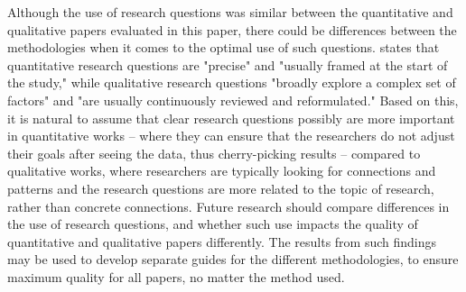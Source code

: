 Although the use of research questions was similar between the quantitative and qualitative papers evaluated in this paper, there could be differences between the methodologies when it comes to the optimal use of such questions. \textcite[p.3-4]{Barroga_2022} states that quantitative research questions are "precise" and "usually framed at the start of the study," while qualitative research questions "broadly explore a complex set of factors" and "are usually continuously reviewed and reformulated." Based on this, it is natural to assume that clear research questions possibly are more important in quantitative works -- where they can ensure that the researchers do not adjust their goals after seeing the data, thus cherry-picking results -- compared to qualitative works, where researchers are typically looking for connections and patterns and the research questions are more related to the topic of research, rather than concrete connections. Future research should compare differences in the use of research questions, and whether such use impacts the quality of quantitative and qualitative papers differently. The results from such findings may be used to develop separate guides for the different methodologies, to ensure maximum quality for all papers, no matter the method used.